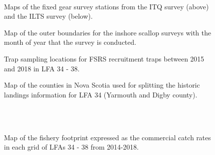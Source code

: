 \documentclass[11pt]{article}
\newcommand{\e}{\string~/bio.data/bio.lobster/figures/LFA3438Framework2019/} %
\begin{document}
     \begin{figure}
    \centering
        \\
        \caption{Maps of the fixed gear survey stations from the ITQ survey (above) and the ILTS survey (below).}
    \end{figure}

\begin{figure}
    \centering
        \caption{Map of the outer boundaries for the inshore scallop surveys with the month of year that the survey is conducted.}
    \end{figure}

   \begin{figure}
    \centering
        \caption{Trap sampling locations for FSRS recruitment traps between 2015 and 2018 in LFA 34 - 38.}

    \end{figure}


\begin{figure}
\centering
    \caption{Map of the counties in Nova Scotia used for splitting the historic landings information for LFA 34 (Yarmouth and Digby county).}

\end{figure}


  \begin{figure}
        \centering
    \\
                \\
        
         \caption{Map of the fishery footprint expressed as the commercial catch rates in each grid of LFAs 34 - 38 from 2014-2018.}
        \end{figure}
\end{document}
